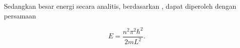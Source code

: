 \noindent
Sedangkan besar energi secara analitis, berdasarkan \cite{griffithsIntroductionQuantumMechanics2019}, dapat diperoleh dengan persamaan

\begin{equation} \label{eq:analytical_energy}
	E = \frac{n^2 \pi^2 \hbar^2}{2m L^2}.
\end{equation}









